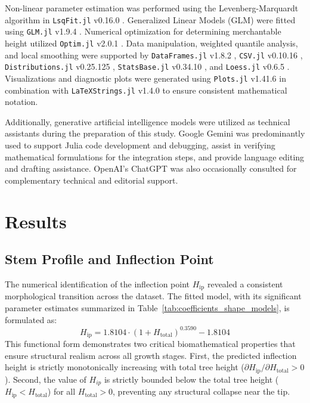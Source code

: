 \documentclass[twocolumn, bibliography=totoc]{scrartcl}
\begin{document}
Non-linear parameter estimation was performed using the Levenberg-Marquardt algorithm in \texttt{LsqFit.jl} v0.16.0 \citep{juliaLsqFit}. Generalized Linear Models (GLM) were fitted using \texttt{GLM.jl} v1.9.4 \citep{juliaGLM}. Numerical optimization for determining merchantable height utilized \texttt{Optim.jl} v2.0.1 \citep{juliaOptim}. Data manipulation, weighted quantile analysis, and local smoothing were supported by \texttt{DataFrames.jl} v1.8.2 \citep{juliaDataframes}, \texttt{CSV.jl} v0.10.16 \citep{juliaCsv}, \texttt{Distributions.jl} v0.25.125 \citep{juliaDistributions,JSSv098i16}, \texttt{StatsBase.jl} v0.34.10 \citep{juliaStatsBase}, and \texttt{Loess.jl} v0.6.5 \citep{juliaLoess}. Visualizations and diagnostic plots were generated using \texttt{Plots.jl} v1.41.6 \citep{juliaPlots} in combination with \texttt{LaTeXStrings.jl} v1.4.0 \citep{juliaLaTeXStrings} to ensure consistent mathematical notation.

Additionally, generative artificial intelligence models were utilized as technical assistants during the preparation of this study. Google Gemini \citep{GoogleGemini} was predominantly used to support Julia code development and debugging, assist in verifying mathematical formulations for the integration steps, and provide language editing and drafting assistance. OpenAI's ChatGPT \citep{OpenAIChatGPT} was also occasionally consulted for complementary technical and editorial support.


\section{Results}

\subsection{Stem Profile and Inflection Point}

The numerical identification of the inflection point $H_{\text{ip}}$ revealed a consistent morphological transition across the dataset. The fitted model, with its significant parameter estimates summarized in Table~\ref{tab:coefficients_shape_models}, is formulated as:
\begin{equation}
  H_{\text{ip}} = 1.8104 \cdot (1 + H_{\text{total}})^{0.3590} - 1.8104
\end{equation}
This functional form demonstrates two critical biomathematical properties that ensure structural realism across all growth stages. First, the predicted inflection height is strictly monotonically increasing with total tree height ($\partial H_{\text{ip}} / \partial H_{\text{total}} > 0$). Second, the value of $H_{ip}$ is strictly bounded below the total tree height ($H_{\text{ip}} < H_{\text{total}}$) for all $H_{\text{total}} > 0$, preventing any structural collapse near the tip. 
\end{document}
